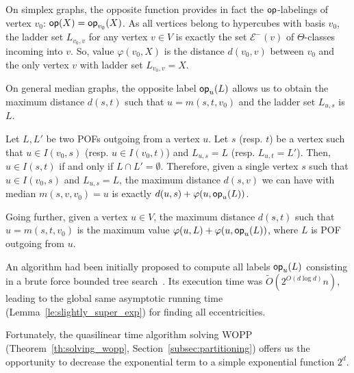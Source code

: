 \documentclass[a4paper,UKenglish,numberwithinsect,cleveref, autoref,anonymous]{lipics-v2021}
\newcommand{\opp}{\mbox{\textsf{op}}}
\begin{document}
On simplex graphs, the opposite function provides in fact the $\opp$-labelings of vertex $v_0$: $\opp(X) = \opp_{v_0}(X)$. As all vertices belong to hypercubes with basis $v_0$, the ladder set $L_{v_0,v}$ for any vertex $v\in V$ is exactly the set $\mathcal{E}^-(v)$ of $\Theta$-classes incoming into $v$. So, value $\varphi(v_0,X)$ is the distance $d(v_0,v)$ between $v_0$ and the only vertex $v$ with ladder set $L_{v_0,v} = X$.

On general median graphs, the opposite label $\opp_u(L)$ allows us to obtain the maximum distance $d(s,t)$ such that $u = m(s,t,v_0)$ and the ladder set $L_{u,s}$ is $L$.

\begin{lemma}
Let $L,L'$ be two POFs outgoing from a vertex $u$. Let $s$ (resp. $t$) be a vertex such that $u \in I(v_0,s)$ (resp. $u \in I(v_0,t)$) and $L_{u,s} = L$ (resp. $L_{u,t} = L'$). Then, $u \in I(s,t)$ if and only if $L \cap L' = \emptyset$. Therefore, given a single vertex $s$ such that $u \in I(v_0,s)$ and $L_{u,s} = L$, the maximum distance $d(s,v)$ we can have with median $m(s,v,v_0) = u$ is exactly $d(u,s)+\varphi(u,\opp_u(L))$.
\label{le:property_opp}
\end{lemma}

Going further, given a vertex $u \in V$, the maximum distance $d(s,t)$ such that $u = m(s,t,v_0)$ is the maximum value $\varphi(u,L) + \varphi(u,\opp_u(L))$, where $L$ is POF outgoing from $u$.

An algorithm had been initially proposed to compute all labels $\opp_u(L)$ consisting in a brute force bounded tree search~\cite{BeHa21}. Its execution time was $\tilde{O}(2^{O(d\log d)}n)$, leading to the global same asymptotic running time (Lemma~\ref{le:slightly_super_exp}) for finding all eccentricities.

Fortunately, the quasilinear time algorithm solving WOPP (Theorem~\ref{th:solving_wopp}, Section~\ref{subsec:partitioning}) offers us the opportunity to decrease the exponential term to a simple exponential function $2^d$.
\end{document}
